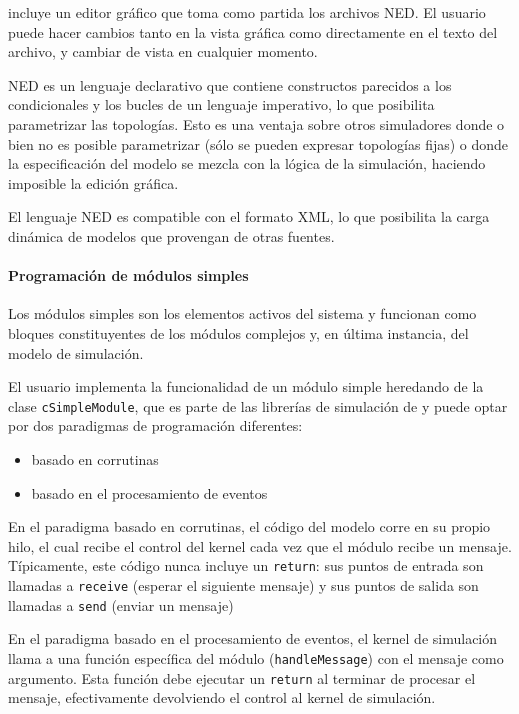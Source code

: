 \documentclass[]{article}
\begin{document}
\omnetpp{} incluye un editor gráfico que toma como partida los archivos NED. El
usuario puede hacer cambios tanto en la vista gráfica como directamente en el
texto del archivo, y cambiar de vista en cualquier momento.

NED es un lenguaje declarativo que contiene constructos parecidos a los
condicionales y los bucles de un lenguaje imperativo, lo que posibilita
parametrizar las topologías. Esto es una ventaja sobre otros simuladores donde
o bien no es posible parametrizar (sólo se pueden expresar topologías fijas) o
donde la especificación del modelo se mezcla con la lógica de la simulación,
haciendo imposible la edición gráfica.

El lenguaje NED es compatible con el formato XML, lo que posibilita la carga
dinámica de modelos que provengan de otras fuentes.

\paragraph{Programación de módulos simples}

Los módulos simples son los elementos activos del sistema y funcionan como
bloques constituyentes de los módulos complejos y, en última instancia, del
modelo de simulación.

El usuario implementa la funcionalidad de un módulo simple heredando de la
clase \verb!cSimpleModule!, que es parte de las librerías de simulación de
\omnetpp{} y puede optar por dos paradigmas de programación diferentes:

\begin{itemize}
    \item basado en corrutinas
    \item basado en el procesamiento de eventos
\end{itemize}

En el paradigma basado en corrutinas, el código del modelo corre en su propio
hilo, el cual recibe el control del kernel cada vez que el módulo recibe un
mensaje. Típicamente, este código nunca incluye un \verb!return!: sus puntos de
entrada son llamadas a \verb!receive! (esperar el siguiente mensaje) y sus
puntos de salida son llamadas a \verb!send! (enviar un mensaje)

En el paradigma basado en el procesamiento de eventos, el kernel de simulación
llama a una función específica del módulo (\verb!handleMessage!) con el mensaje
como argumento. Esta función debe ejecutar un \verb!return! al terminar de
procesar el mensaje, efectivamente devolviendo el control al kernel de
simulación.
\end{document}
